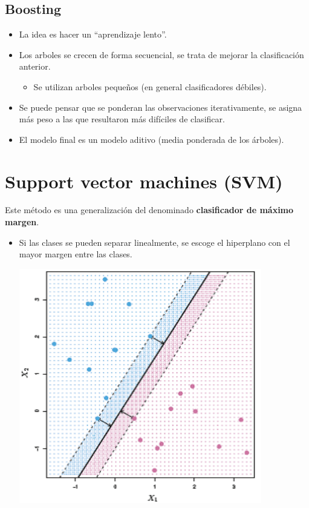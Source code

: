 \documentclass[]{book}
\providecommand{\tightlist}{%
  \setlength{\itemsep}{0pt}\setlength{\parskip}{0pt}}
\begin{document}
\hypertarget{boosting}{%
\subsection{Boosting}\label{boosting}}

\begin{itemize}
\item
  La idea es hacer un ``aprendizaje lento''.
\item
  Los arboles se crecen de forma secuencial, se trata de mejorar la
  clasificación anterior.

  \begin{itemize}
  \tightlist
  \item
    Se utilizan arboles pequeños (en general clasificadores
    débiles).
  \end{itemize}
\item
  Se puede pensar que se ponderan las observaciones iterativamente, se
  asigna más peso a las que resultaron más difíciles de clasificar.
\item
  El modelo final es un modelo aditivo (media ponderada de los
  árboles).
\end{itemize}

\hypertarget{support-vector-machines-svm}{%
\section{Support vector machines (SVM)}\label{support-vector-machines-svm}}

Este método es una generalización del denominado \textbf{clasificador de
máximo margen}.

\begin{itemize}
\item
  Si las clases se pueden separar linealmente, se escoge el
  hiperplano con el mayor margen entre las clases.

  \includegraphics[width=4.17in]{images/svm1}
\end{itemize}
\end{document}
